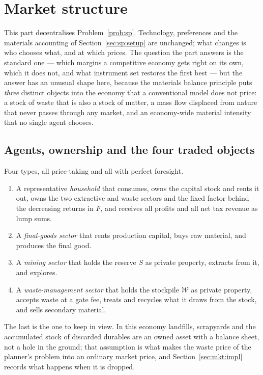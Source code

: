 \section{Market structure}\label{sec:mkt:setup}

This part decentralises Problem~\ref{prob:sp}. Technology, preferences and the materials accounting of Section~\ref{sec:sp:setup} are unchanged; what changes is who chooses what, and at which prices. The question the part answers is the standard one --- which margins a competitive economy gets right on its own, which it does not, and what instrument set restores the first best --- but the answer has an unusual shape here, because the materials balance principle puts \emph{three} distinct objects into the economy that a conventional model does not price: a stock of waste that is also a stock of matter, a mass flow displaced from nature that never passes through any market, and an economy-wide material intensity that no single agent chooses.

\subsection{Agents, ownership and the four traded objects}\label{sec:mkt:setup:agents}

 Four types, all price-taking and all with perfect foresight.
\begin{enumerate}
\item A representative \emph{household} that consumes, owns the capital stock and rents it out, owns the two extractive and waste sectors and the fixed factor behind the decreasing returns in $F$, and receives all profits and all net tax revenue as lump sums.
\item A \emph{final-goods sector} that rents production capital, buys raw material, and produces the final good.
\item A \emph{mining sector} that holds the reserve $S$ as private property, extracts from it, and explores.
\item A \emph{waste-management sector} that holds the stockpile $\mathcal W$ as private property, accepts waste at a gate fee, treats and recycles what it draws from the stock, and sells secondary material.
\end{enumerate}
The last is the one to keep in view. In this economy landfills, scrapyards and the accumulated stock of discarded durables are an owned asset with a balance sheet, not a hole in the ground; that assumption is what makes the waste price of the planner's problem into an ordinary market price, and Section~\ref{sec:mkt:impl} records what happens when it is dropped.

